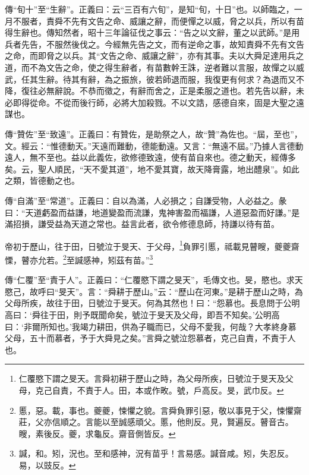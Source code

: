 {\noindent\zhuan{}\fzbyks 傳“旬十”至“生辭”。正義曰：云“三百有六旬”，是知“旬，十日”也。以師臨之，一月不服者，責舜不先有文告之命、威讓之辭，而便憚之以威，脅之以兵，所以有苗得生辭也。傳知然者，昭十三年論征伐之事云：“告之以文辭，董之以武師。”是用兵者先告，不服然後伐之。今經無先告之文，而有逆命之事，故知責舜不先有文告之命，而即脅之以兵。其“文告之命、威讓之辭”，亦有其事。夫以大舜足達用兵之道，而不為文告之命，使之得生辭者，有苗數幹王誅，逆者難以言服，故憚之以威武，任其生辭。待其有辭，為之振旅，彼若師退而服，我復更有何求？為退而又不降，復往必無辭說。不恭而徵之，有辭而舍之，正是柔服之道也。若先告以辭，未必即得從命。不從而後行師，必將大加殺戮。不以文誥，感德自來，固是大聖之遠謀也。 \par}

{\noindent\zhuan{}\fzbyks 傳“贊佐”至“致遠”。正義曰：有贊佐，是助祭之人，故“贊”為佐也。“屆，至也”，文。經云：“惟德動天。”天遠而難動，德能動遠。又言：“無遠不屆。”乃據人言德動遠人，無不至也。益以此義佐，欲修德致遠，使有苗自來也。德之動天，經傳多矣。云，聖人順民，“天不愛其道”，地不愛其寶，故天降膏露，地出醴泉”。如此之類，皆德動之也。 \par}

{\noindent\zhuan{}\fzbyks 傳“自滿”至“常道”。正義曰：自以為滿，人必損之；自謙受物，人必益之。彖曰：“天道虧盈而益謙，地道變盈而流謙，鬼神害盈而福謙，人道惡盈而好謙。”是滿招損，謙受益為天道之常也。益言此者，欲令修德息師，持謙以待有苗。 \par}

帝初于歷山，往于田，日號泣于旻天、于父母，\footnote{仁覆愍下謂之旻天。言舜初耕于歷山之時，為父母所疾，日號泣于旻天及父母，克己自責，不責于人。田，本或作畋。號，戶高反。旻，武巾反。}負罪引慝，祗載見瞽瞍，夔夔齋慄，瞽亦允若。\footnote{慝，惡。載，事也。夔夔，悚懼之貌。言舜負罪引惡，敬以事見于父，悚懼齋莊，父亦信順之。言能以至誠感頑父。慝，他則反。見，賢遍反。瞽音古。瞍，素後反。夔，求龜反。齋音側皆反。}至諴感神，矧茲有苗。”\footnote{諴，和。矧，況也。至和感神，況有苗乎！言易感。諴音咸。矧，失忍反。易，以豉反。}

{\noindent\zhuan{}\fzbyks 傳“仁覆”至“責于人”。正義曰：“仁覆愍下謂之旻天”，毛傳文也。旻，愍也。求天愍己，故呼曰“旻天”。言：“舜耕于歷山。”云：“歷山在河東。”是耕于歷山之時，為父母所疾，故往于田，日號泣于旻天。何為其然也！曰：“怨慕也。長息問于公明高曰：‘舜往于田，則予既聞命矣，號泣于旻天及父母，即吾不知矣。’公明高曰：‘非爾所知也。’我竭力耕田，供為子職而已，父母不愛我，何哉？大孝終身慕父母，五十而慕者，予于大舜見之矣。”言舜之號泣怨慕者，克己自責，不責于人也。 \par}

